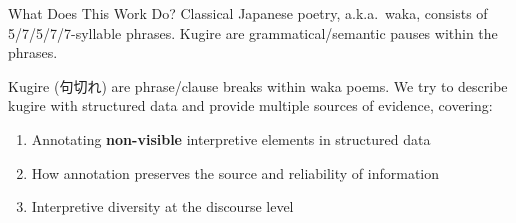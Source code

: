\begin{block}{What Does This Work Do?}
Classical Japanese poetry, a.k.a.\ waka, consists of 5/7/5/7/7-syllable phrases.
Kugire are grammatical/semantic pauses within the phrases.

Kugire (句切れ) are phrase/clause breaks within waka poems. We try to describe
kugire with structured data and provide multiple sources of evidence, covering:
\begin{enumerate}
\item Annotating \textbf{non-visible} interpretive elements in structured data
\item How annotation preserves the source and reliability of information
\item Interpretive diversity at the discourse level
\end{enumerate}
\end{block}
